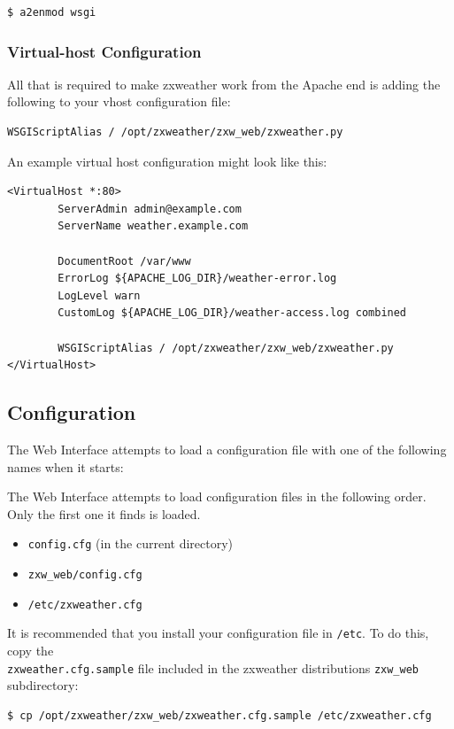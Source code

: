 \documentclass[a4paper,10pt,draft]{book}
\begin{document}
\begin{verbatim}
$ a2enmod wsgi
\end{verbatim}

\subsubsection{Virtual-host Configuration}

All that is required to make zxweather work from the Apache end is adding the following to your vhost configuration file:
\begin{verbatim}
WSGIScriptAlias / /opt/zxweather/zxw_web/zxweather.py
\end{verbatim}

An example virtual host configuration might look like this:

\begin{verbatim}
<VirtualHost *:80>
        ServerAdmin admin@example.com
        ServerName weather.example.com

        DocumentRoot /var/www
        ErrorLog ${APACHE_LOG_DIR}/weather-error.log
        LogLevel warn
        CustomLog ${APACHE_LOG_DIR}/weather-access.log combined

        WSGIScriptAlias / /opt/zxweather/zxw_web/zxweather.py
</VirtualHost>
\end{verbatim}

\subsection{Configuration}

The Web Interface attempts to load a configuration file with one of the following names when it starts:

The Web Interface attempts to load configuration files in the following order. Only the first one it finds is loaded.
\begin{itemize}
\item \verb|config.cfg| (in the current directory)
\item \verb|zxw_web/config.cfg|
\item \verb|/etc/zxweather.cfg|
\end{itemize}

It is recommended that you install your configuration file in \verb|/etc|. To do this, copy the \\ \verb|zxweather.cfg.sample| file included in the zxweather distributions \verb|zxw_web| subdirectory:
\begin{verbatim}
$ cp /opt/zxweather/zxw_web/zxweather.cfg.sample /etc/zxweather.cfg
\end{verbatim}
\end{document}
